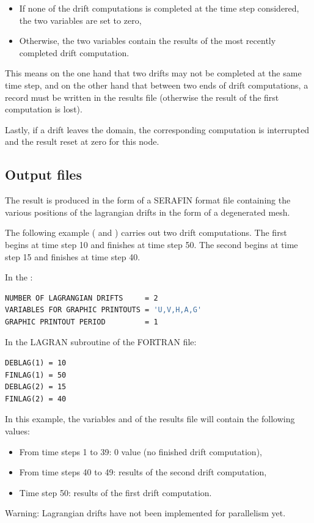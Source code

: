 \begin{itemize}
\item If none of the drift computations is completed at the time step considered,
the two variables are set to zero,

\item Otherwise, the two variables contain the results of the most recently
completed drift computation.
\end{itemize}

This means on the one hand that two drifts may not be completed at the same time
step, and on the other hand that between two ends of drift computations,
a record must be written in the results file
(otherwise the result of the first computation is lost).

Lastly, if a drift leaves the domain, the corresponding computation is
interrupted and the result reset at zero for this node.


\subsection{Output files}

The result is produced in the form of a SERAFIN format file containing the
various positions of the lagrangian drifts in the form of a degenerated mesh.


The following example ( and )
carries out two drift computations.
The first begins at time step 10 and finishes at time step 50.
The second begins at time step 15 and finishes at time step 40.

In the :
\begin{lstlisting}[language=bash]
NUMBER OF LAGRANGIAN DRIFTS     = 2
VARIABLES FOR GRAPHIC PRINTOUTS = 'U,V,H,A,G'
GRAPHIC PRINTOUT PERIOD         = 1
\end{lstlisting}
  In the LAGRAN subroutine of the FORTRAN file:
\begin{lstlisting}[language=TelFortran]
DEBLAG(1) = 10
FINLAG(1) = 50
DEBLAG(2) = 15
FINLAG(2) = 40
\end{lstlisting}
In this example, the variables  and
 of the results file will contain the following values:

\begin{itemize}
\item From time steps 1 to 39: 0 value (no finished drift computation),

\item From time steps 40 to 49: results of the second drift computation,

\item Time step 50: results of the first drift computation.
\end{itemize}


\begin{WarningBlock}{Warning:}
Lagrangian drifts have not been implemented for parallelism yet.
\end{WarningBlock}
